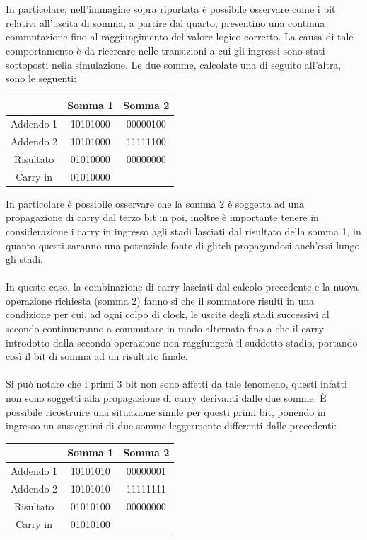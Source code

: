 \documentclass[11pt,  english, makeidx, a4paper, titlepage, oneside]{book}
\begin{document}
\\\\
In particolare, nell'immagine sopra riportata è possibile osservare come i bit relativi all'uscita di somma, a partire dal
quarto, presentino una continua commutazione fino al raggiungimento del valore logico corretto. La causa di tale comportamento è da ricercare
nelle transizioni a cui gli ingressi sono stati sottoposti nella simulazione. Le due somme, calcolate una di seguito all'altra,
sono le seguenti:
\vspace{0.3cm}
\begin{center}
\begin{tabular}{|c|c|c|}
\hline
& Somma 1 & Somma 2 \\
\hline
Addendo 1 & 10101000 & 00000100\\
\hline
Addendo 2 & 10101000 & 11111100\\
\hline
Risultato & 01010000 & 00000000\\
\hline
Carry in & 01010000 & \\
\hline
\end{tabular}
\end{center}
\vspace{0.3cm}
In particolare è possibile osservare che la somma 2 è soggetta ad una propagazione di carry dal terzo bit in poi, inoltre è importante tenere
in considerazione i carry in ingresso agli stadi lasciati dal risultato della somma 1, in quanto questi saranno una potenziale fonte di glitch propagandosi anch'essi lungo gli stadi. \\\\
In questo caso, la combinazione di carry lasciati dal calcolo precedente e la nuova operazione richiesta (somma 2) fanno si che il sommatore risulti in una condizione per cui, ad ogni colpo di clock, le uscite degli stadi successivi al secondo continueranno a commutare in modo alternato fino a che il carry introdotto dalla seconda operazione non raggiungerà il suddetto stadio, portando così
il bit di somma ad un risultato finale. 
\\\\
Si può notare che i primi 3 bit non sono affetti da tale fenomeno, questi infatti non sono soggetti alla propagazione di carry derivanti dalle due somme. È possibile ricostruire una situazione simile per questi primi bit, ponendo in ingresso un susseguirsi di due
somme leggermente differenti dalle precedenti:
\vspace{0.3cm}
\begin{center}
\begin{tabular}{|c|c|c|}
\hline
& Somma 1 & Somma 2 \\
\hline
Addendo 1 & 10101010 & 00000001\\
\hline
Addendo 2 & 10101010 & 11111111\\
\hline
Risultato & 01010100 & 00000000\\
\hline
Carry in & 01010100 & \\
\hline
\end{tabular}
\end{center}
\end{document}
